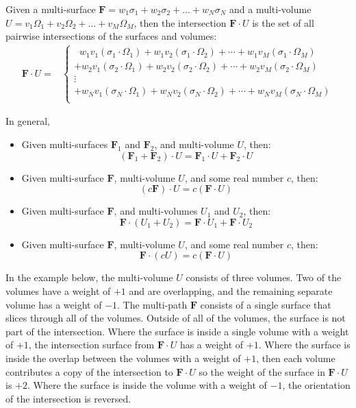 Given a multi-surface \(\mathbf{F} = w_1\sigma_1 + w_2\sigma_2 + ... + w_N\sigma_N\) and a multi-volume \\ \(U = v_1\Omega_1 + v_2\Omega_2 + ... + v_M\Omega_M\), then the intersection \(\mathbf{F} \cdot U\) is the set of all pairwise intersections of the surfaces and volumes:
\begin{align*}
\mathbf{F} \cdot U = & \left\{\begin{array}{c}
\;\; w_1 v_1 (\sigma_1 \cdot \Omega_1) + w_1 v_2 (\sigma_1 \cdot \Omega_2) + \cdots + w_1 v_M (\sigma_1 \cdot \Omega_M) \\ 
+ w_2 v_1 (\sigma_2 \cdot \Omega_1) + w_2 v_2 (\sigma_2 \cdot \Omega_2) + \cdots + w_2 v_M (\sigma_2 \cdot \Omega_M) \\ 
\vdots \\
+ w_N v_1 (\sigma_N \cdot \Omega_1) + w_N v_2 (\sigma_N \cdot \Omega_2) + \cdots + w_N v_M (\sigma_N \cdot \Omega_M) \\ 
\end{array}\right.
\end{align*}

In general,
\begin{itemize}
\item Given multi-surfaces \(\mathbf{F}_1\) and \(\mathbf{F}_2\), and multi-volume \(U\), then:
\[(\mathbf{F}_1 + \mathbf{F}_2) \cdot U = \mathbf{F}_1 \cdot U + \mathbf{F}_2 \cdot U\] 
\item Given multi-surface \(\mathbf{F}\), multi-volume \(U\), and some real number \(c\), then:
\[(c\mathbf{F}) \cdot U = c(\mathbf{F} \cdot U)\]
\item Given multi-surface \(\mathbf{F}\), and multi-volumes \(U_1\) and \(U_2\), then:
\[\mathbf{F} \cdot (U_1 + U_2) = \mathbf{F} \cdot U_1 + \mathbf{F} \cdot U_2\] 
\item Given multi-surface \(\mathbf{F}\), multi-volume \(U\), and some real number \(c\), then:
\[\mathbf{F} \cdot (cU) = c(\mathbf{F} \cdot U)\]
\end{itemize}

In the example below, the multi-volume \(U\) consists of three volumes. Two of the volumes have a weight of \(+1\) and are overlapping, and the remaining separate volume has a weight of \(-1\). The multi-path \(\mathbf{F}\) consists of a single surface that slices through all of the volumes. Outside of all of the volumes, the surface is not part of the intersection. Where the surface is inside a single volume with a weight of \(+1\), the intersection surface from \(\mathbf{F} \cdot U\) has a weight of \(+1\). Where the surface is inside the overlap between the volumes with a weight of \(+1\), then each volume contributes a copy of the intersection to \(\mathbf{F} \cdot U\) so the weight of the surface in \(\mathbf{F} \cdot U\) is \(+2\). Where the surface is inside the volume with a weight of \(-1\), the orientation of the intersection is reversed.  

